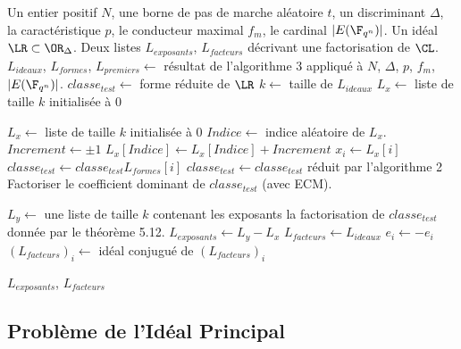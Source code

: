\begin{algorithm}
	\caption{Factorisation de la classe d'un idéal dans une famille génératrice donnée}
	\begin{algorithmic}[1]
		\Require Un entier positif $N$, une borne de pas de marche aléatoire $t$, un discriminant $\Delta$, la caractéristique $p$, le conducteur maximal $f_{m}$, le cardinal $|E(\F_{q^{n}})|$. Un idéal $\LR\subset\OR_{\Delta}$. 
		\Ensure Deux listes $L_{exposants}$, $L_{facteurs}$ décrivant une factorisation de $\CL$.
		\State $L_{ideaux}$, $L_{formes}$, $L_{premiers}\gets$ résultat de l'algorithme 3 appliqué à $N$, $\Delta$, $p$, $f_{m}$, $|E(\F_{q^{n}})|$. 
		\State $classe_{test}\gets$ forme réduite de $\LR$
		\State $k\gets$ taille de $L_{ideaux}$
		\State $L_{x}\gets$ liste de taille $k$ initialisée à $0$
		
		\State $L_{x}\gets$ liste de taille $k$ initialisée à $0$
		\State $Indice\gets$ indice aléatoire de $L_{x}$.
		\State $Increment\gets\pm1$
		\State $L_{x}\left[ Indice\right] \gets L_{x}\left[ Indice\right] + Increment$
		\EndFor
		\State $x_{i}\gets L_{x}[i]$
		\State $classe_{test}\gets classe_{test}L_{formes}[i]$
		\State $classe_{test}\gets classe_{test}$ réduit par l'algorithme 2
		\State Factoriser le coefficient dominant de $classe_{test}$ (avec ECM).
		\EndFor
		\EndFor
		\EndWhile
		
		\State $L_{y}\gets$ une liste de taille $k$ contenant les exposants la factorisation de $classe_{test}$ donnée par le théorème 5.12.
		\State $L_{exposants}\gets L_{y} - L_{x}$
		\State $L_{facteurs}\gets L_{ideaux}$
		\State $e_i\gets-e_i$
		\State $\left( L_{facteurs}\right) _{i} \gets $ idéal conjugué de $\left( L_{facteurs}\right) _{i}$
		\EndIf
		\EndFor
		
		\State \Return $L_{exposants}$, $L_{facteurs}$
	\end{algorithmic}
\end{algorithm}



\subsection{Problème de l'Idéal Principal}

